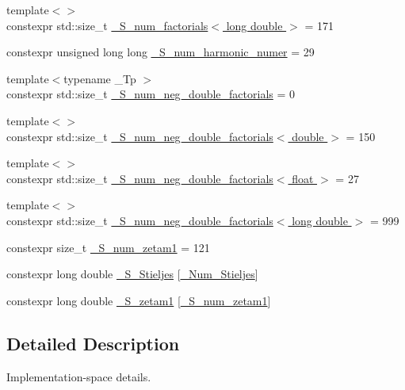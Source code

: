 \begin{DoxyCompactItemize}
\item 
{\footnotesize template$<$$>$ }\\constexpr std\+::size\+\_\+t \hyperlink{namespacestd_1_1____detail_ab90b8eb39ff963a5ed533a3be0b7f7fd}{\+\_\+\+S\+\_\+num\+\_\+factorials$<$ long double $>$} = 171
\item 
constexpr unsigned long long \hyperlink{namespacestd_1_1____detail_a554788747841f6abbfd7572673df32ad}{\+\_\+\+S\+\_\+num\+\_\+harmonic\+\_\+numer} = 29
\item 
{\footnotesize template$<$typename \+\_\+\+Tp $>$ }\\constexpr std\+::size\+\_\+t \hyperlink{namespacestd_1_1____detail_ac386f200e589ce1fc895c2aac0e47f8c}{\+\_\+\+S\+\_\+num\+\_\+neg\+\_\+double\+\_\+factorials} = 0
\item 
{\footnotesize template$<$$>$ }\\constexpr std\+::size\+\_\+t \hyperlink{namespacestd_1_1____detail_a2d14a1207a6fea22f32586dfd41cf49d}{\+\_\+\+S\+\_\+num\+\_\+neg\+\_\+double\+\_\+factorials$<$ double $>$} = 150
\item 
{\footnotesize template$<$$>$ }\\constexpr std\+::size\+\_\+t \hyperlink{namespacestd_1_1____detail_a3ce62e66e9a196fd89b4d841f7374d68}{\+\_\+\+S\+\_\+num\+\_\+neg\+\_\+double\+\_\+factorials$<$ float $>$} = 27
\item 
{\footnotesize template$<$$>$ }\\constexpr std\+::size\+\_\+t \hyperlink{namespacestd_1_1____detail_a2ef051ec96e521e71489d2327d11c22a}{\+\_\+\+S\+\_\+num\+\_\+neg\+\_\+double\+\_\+factorials$<$ long double $>$} = 999
\item 
constexpr size\+\_\+t \hyperlink{namespacestd_1_1____detail_a807e36c2aec3a9f27fdb21726cd464e2}{\+\_\+\+S\+\_\+num\+\_\+zetam1} = 121
\item 
constexpr long double \hyperlink{namespacestd_1_1____detail_aca60d4f73c51098c997f11692bacbcfe}{\+\_\+\+S\+\_\+\+Stieljes} \mbox{[}\hyperlink{namespacestd_1_1____detail_ab80ca58ee274bce962adc6208bfe4e2d}{\+\_\+\+Num\+\_\+\+Stieljes}\mbox{]}
\item 
constexpr long double \hyperlink{namespacestd_1_1____detail_a22ed80d9e5c3bc79e61a3cdb8e79a462}{\+\_\+\+S\+\_\+zetam1} \mbox{[}\hyperlink{namespacestd_1_1____detail_a807e36c2aec3a9f27fdb21726cd464e2}{\+\_\+\+S\+\_\+num\+\_\+zetam1}\mbox{]}
\end{DoxyCompactItemize}


\subsection{Detailed Description}
Implementation-\/space details. 

